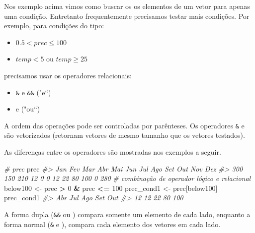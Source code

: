 \documentclass[]{book}
\newenvironment{Shaded}{\begin{snugshade}}{\end{snugshade}}
\newcommand{\DecValTok}[1]{\textcolor[rgb]{0.00,0.00,0.81}{#1}}
\newcommand{\StringTok}[1]{\textcolor[rgb]{0.31,0.60,0.02}{#1}}
\newcommand{\CommentTok}[1]{\textcolor[rgb]{0.56,0.35,0.01}{\textit{#1}}}
\newcommand{\OperatorTok}[1]{\textcolor[rgb]{0.81,0.36,0.00}{\textbf{#1}}}
\newcommand{\NormalTok}[1]{#1}
\providecommand{\tightlist}{%
  \setlength{\itemsep}{0pt}\setlength{\parskip}{0pt}}
\begin{document}
Nos exemplo acima vimos como buscar os os elementos de um vetor para
apenas uma condição. Entretanto frequentemente precisamos testar mais
condições. Por exemplo, para condições do tipo:

\begin{itemize}
\tightlist
\item
  \(0.5 < prec \leq 100\)
\item
  \(temp < 5\) ou \(temp \geq 25\)
\end{itemize}

precisamos usar os operadores relacionais:

\begin{itemize}
\item
  \texttt{\&} e \texttt{\&\&} ("e``)
\item
  \texttt{\textbar{}} e \texttt{\textbar{}\textbar{}} ("ou``)
\end{itemize}

A ordem das operações pode ser controladas por parênteses. Os operadores
\texttt{\&} e \texttt{\textbar{}} são vetorizados (retornam vetores de
mesmo tamanho que os vetores testados).

As diferenças entre os operadores são mostradas nos exemplos a seguir.

\begin{Shaded}
\begin{Highlighting}[]
\CommentTok{# prec}
\NormalTok{prec}
\CommentTok{#> Jan Fev Mar Abr Mai Jun Jul Ago Set Out Nov Dez }
\CommentTok{#> 300 150 210  12   0   0  12  22  80 100   0 280}
\CommentTok{# combinação de operador lógico e relacional}
\NormalTok{below100 <-}\StringTok{ }\NormalTok{prec }\OperatorTok{>}\StringTok{ }\DecValTok{0} \OperatorTok{&}\StringTok{ }\NormalTok{prec }\OperatorTok{<=}\StringTok{ }\DecValTok{100}
\NormalTok{prec_cond1 <-}\StringTok{ }\NormalTok{prec[below100]}
\NormalTok{prec_cond1}
\CommentTok{#> Abr Jul Ago Set Out }
\CommentTok{#>  12  12  22  80 100}
\end{Highlighting}
\end{Shaded}

A forma dupla (\texttt{\&\&} ou \texttt{\textbar{}\textbar{}}) compara
somente um elemento de cada lado, enquanto a forma normal (\texttt{\&} e
\texttt{\textbar{}}), compara cada elemento dos vetores em cada lado.
\end{document}
